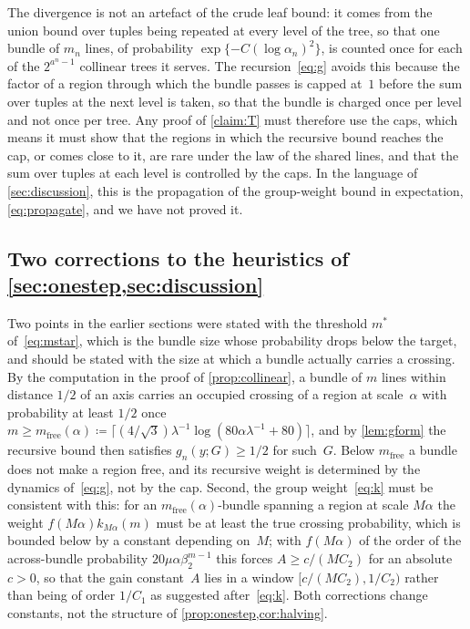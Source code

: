 \documentclass[11pt,letterpaper]{article}
\begin{document}
The divergence is not an artefact of the crude leaf bound: it comes from the union bound over tuples being repeated at every level of the tree, so that one bundle of $m_n$ lines, of probability $\exp\{-C(\log\alpha_n)^2\}$, is counted once for each of the $2^{a^n-1}$ collinear trees it serves. The recursion~\eqref{eq:g} avoids this because the factor of a region through which the bundle passes is capped at~$1$ before the sum over tuples at the next level is taken, so that the bundle is charged once per level and not once per tree. Any proof of \cref{claim:T} must therefore use the caps, which means it must show that the regions in which the recursive bound reaches the cap, or comes close to it, are rare under the law of the shared lines, and that the sum over tuples at each level is controlled by the caps. In the language of \cref{sec:discussion}, this is the propagation of the group-weight bound in expectation, \eqref{eq:propagate}, and we have not proved it.

\subsection{Two corrections to the heuristics of \cref{sec:onestep,sec:discussion}}

Two points in the earlier sections were stated with the threshold $m^*$ of~\eqref{eq:mstar}, which is the bundle size whose probability drops below the target, and should be stated with the size at which a bundle actually carries a crossing. By the computation in the proof of \cref{prop:collinear}, a bundle of $m$ lines within distance $1/2$ of an axis carries an occupied crossing of a region at scale~$\alpha$ with probability at least $1/2$ once $m\ge m_{\mathrm{free}}(\alpha)\coloneqq\lceil(4/\sqrt3)\lambda^{-1}\log(80\alpha\lambda^{-1}+80)\rceil$, and by \cref{lem:gform} the recursive bound then satisfies $g_n(y;G)\ge1/2$ for such~$G$. Below $m_{\mathrm{free}}$ a bundle does not make a region free, and its recursive weight is determined by the dynamics of~\eqref{eq:g}, not by the cap. Second, the group weight~\eqref{eq:k} must be consistent with this: for an $m_{\mathrm{free}}(\alpha)$-bundle spanning a region at scale $M\alpha$ the weight $f(M\alpha)k_{M\alpha}(m)$ must be at least the true crossing probability, which is bounded below by a constant depending on~$M$; with $f(M\alpha)$ of the order of the across-bundle probability $20\mu\alpha\beta_2^{m-1}$ this forces $A\ge c/(MC_2)$ for an absolute $c>0$, so that the gain constant~$A$ lies in a window $[c/(MC_2),1/C_2)$ rather than being of order $1/C_1$ as suggested after~\eqref{eq:k}. Both corrections change constants, not the structure of \cref{prop:onestep,cor:halving}.
\end{document}
